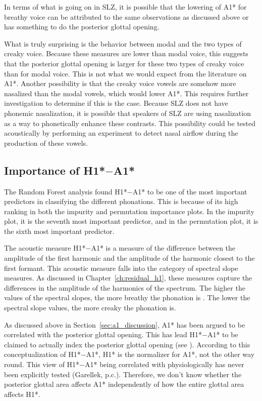 In terms of what is going on in SLZ, it is possible that the lowering of A1* for breathy voice can be attributed to the same observations as discussed above or has something to do the posterior glottal opening. 

What is truly surprising is the behavior between modal and the two types of creaky voice. Because these measures are lower than modal voice, this suggests that the posterior glottal opening is larger for these two types of creaky voice than for modal voice. This is not what we would expect from the literature on A1*. Another possibility is that the creaky voice vowels are somehow more nasalized than the modal vowels, which would lower A1*. This requires further investigation to determine if this is the case. Because SLZ does not have phonemic nasalization, it is possible that speakers of SLZ are using nasalization as a way to phonetically enhance these contrasts. This possibility could be tested acoustically by performing an experiment to detect nasal airflow during the production of these vowels. 

\subsection{Importance of \texorpdfstring{H1*$-$A1*}{H1*-A1*}} \label{sec:h1a1_discussion}

The Random Forest analysis found H1*$-$A1* to be one of the most important predictors in classifying the different phonations. This is because of its high ranking in both the impurity and permutation importance plots. In the impurity plot, it is the seventh most important predictor, and in the permutation plot, it is the sixth most important predictor.

The acoustic measure H1*$-$A1* is a measure of the difference between the amplitude of the first harmonic and the amplitude of the harmonic closest to the first formant. This acoustic measure falls into the category of spectral slope measures. As discussed in Chapter~\ref{ch:residual_h1}, these measures capture the differences in the amplitude of the harmonics of the spectrum. The higher the values of the spectral slopes, the more breathy the phonation is \citep{fischer-jorgensenPhoneticAnalysisBreathy1968}. The lower the spectral slope values, the more creaky the phonation is.

As discussed above in Section~\ref{sec:a1_discussion}, A1* has been argued to be correlated with the posterior glottal opening. This has lead H1*$-$A1* to be claimed to actually index the posterior glottal opening (see \cite{hansonModelsPhonation2001}). According to this conceptualization of H1*$-$A1*, H1* is the normalizer for A1*, not the other way round. This view of H1*$-$A1* being correlated with physiologically has never been explicitly tested (Garellek, p.c.). Therefore, we don't know whether the posterior glottal area affects A1* independently of how the entire glottal area affects H1*.

